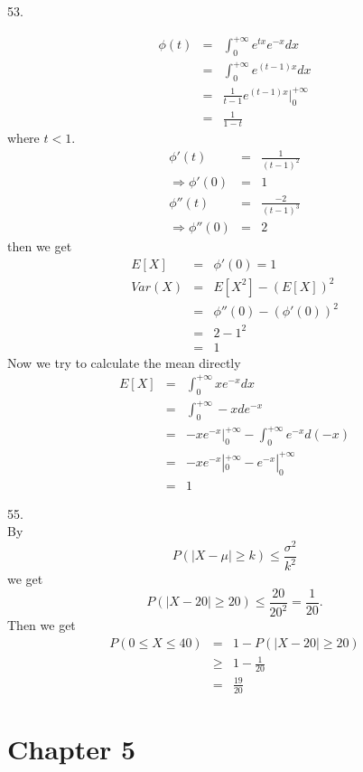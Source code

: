 \documentclass[12pt]{article}
\begin{document}
53.

\begin{eqnarray*}
  \phi(t)
  &=& \int_{0}^{+\infty} e^{tx}e^{-x} dx \\
  &=& \int_{0}^{+\infty} e^{(t-1)x} dx \\
  &=& \frac {1}{t-1} e^{(t-1)x}|_{0}^{+\infty} \\
  &=& \frac {1}{1 - t}
\end{eqnarray*}
where $t < 1$.
\begin{eqnarray*}
  \phi'(t) &=& \frac {1}{(t-1)^2} \\
  \Rightarrow \phi'(0) &=& 1 \\
  \phi''(t) &=& \frac {-2}{(t-1)^3} \\
  \Rightarrow \phi''(0) &=& 2
\end{eqnarray*}
then we get
\begin{eqnarray*}
  E[X] &=& \phi'(0) = 1 \\
  Var(X)
  &=& E[X^2] - (E[X])^2 \\
  &=& \phi''(0) - (\phi'(0))^2 \\
  &=& 2 - 1^2 \\
  &=& 1
\end{eqnarray*}
Now we try to calculate the mean directly
\begin{eqnarray*}
  E[X]
  &=& \int_{0}^{+\infty} x e^{-x} dx \\
  &=& \int_{0}^{+\infty} -x de^{-x} \\
  &=& -xe^{-x}|_0^{+\infty} - \int_{0}^{+\infty} e^{-x} d(-x) \\
  &=& -xe^{-x}|_0^{+\infty} - e^{-x}|_0^{+\infty} \\
  &=& 1
\end{eqnarray*}

55. \\
By 
\begin{equation*}
  P(|X - \mu| \ge k) \le \frac {\sigma^2}{k^2}
\end{equation*}
we get
\begin{equation*}
  P(|X - 20| \ge 20) \le \frac {20}{20^2} = \frac {1}{20}.
\end{equation*}
Then we get
\begin{eqnarray*}
  P(0 \le X \le 40)
  &=& 1 - P(|X - 20| \ge 20) \\
  &\ge& 1 - \frac {1}{20} \\
  &=& \frac {19}{20}
\end{eqnarray*}

\section*{Chapter 5}
\end{document}
